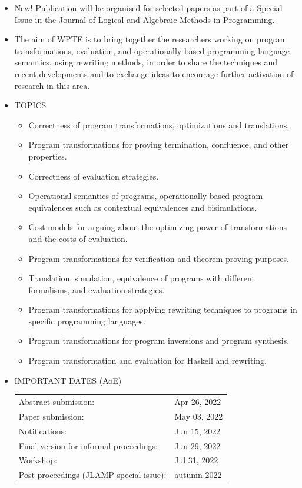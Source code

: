 \documentclass[prodmode,acmtecs]{acmsmall} %
\begin{document}
\begin{itemize}\item  New! Publication will be organised for selected papers as part of a Special Issue in the Journal of Logical and Algebraic Methods in Programming. 
 
\item  The aim of WPTE is to bring together the researchers working on program transformations, evaluation, and operationally based programming language semantics, using rewriting methods, in order to share the techniques and recent developments and to exchange ideas to encourage further activation of research in this area. 
 
\item  TOPICS 
 
\begin{itemize}\item  Correctness of program transformations, optimizations and translations.
\item  Program transformations for proving termination, confluence, and other properties.
\item  Correctness of evaluation strategies.
\item  Operational semantics of programs, operationally-based program equivalences such as contextual equivalences and bisimulations.
\item  Cost-models for arguing about the optimizing power of transformations and the costs of evaluation.
\item  Program transformations for verification and theorem proving purposes.
\item  Translation, simulation, equivalence of programs with different formalisms, and evaluation strategies.
\item  Program transformations for applying rewriting techniques to programs in specific programming languages.
\item  Program transformations for program inversions and program synthesis.
\item  Program transformation and evaluation for Haskell and rewriting.
\end{itemize} 
\item  IMPORTANT DATES (AoE) 
 
\begin{tabulary}{\linewidth}{LL}Abstract submission:  & Apr 26, 2022 \\
Paper submission:  & May 03, 2022 \\
Notifications:  & Jun 15, 2022 \\
Final version for informal proceedings:  & Jun 29, 2022 \\
Workshop:  & Jul 31, 2022 \\
Post-proceedings (JLAMP special issue):  & autumn 2022 \\
\end{tabulary}
 

\end{itemize}
\end{document}
